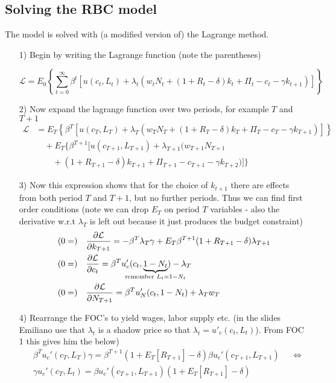 \documentclass[12pt, a4paper]{article}
\begin{document}
\begin{spacing}{1.213}
\subsection{Solving the RBC model}
The model is solved with (a modified version of) the Lagrange method. 
\begin{itemize}
\item[1)] Begin by writing the Lagrange function (note the parentheses)

\begin{equation*}
\mathcal{L} = E_0 \left\{ \sum_{t=0}^{\infty} \beta^t \left[ u(c_t, L_t) + \lambda_t (w_t N_t + (1+R_t - \delta)k_t + \Pi_t - c_t - \gamma k_{t+1}) \right] \right\}
\end{equation*}

\item[2)] Now expand the lagrange function over two periods, for example $T$ and $T+1$ 
\small
\begin{align*}
\mathcal{L} &= E_T \left\{  \beta^{T} \left[ u(c_{T}, L_{T}) + \lambda_{T} (w_{T} N_{T} + (1+R_{T} - \delta)k_{T} + \Pi_{T} - c_{T} - \gamma k_{T+1}) \right] \right\} \\
& \quad + E_T \big\{  \beta^{T+1} [ u(c_{T+1}, L_{T+1}) + \lambda_{T+1} (w_{T+1} N_{T+1}  \\
& \qquad + (1+R_{T+1} - \delta)k_{T+1} + \Pi_{T+1} - c_{T+1} - \gamma k_{T+2}) ] \big\} 
\end{align*}
\normalsize
\item[3)] Now this expression shows that for the choice of $k_{t+1}$ there are effects from both period $T$ and $T+1$, but no further periods. Thus we can find first order conditions (note we can drop $E_{T}$ on period $T$ variables - also the derivative w.r.t $\lambda_T$ is left out because it just produces the budget constraint)
\begin{align*}
& (0=) \quad \frac{\partial \mathcal{L}}{\partial k_{T+1}} = -\beta^T \lambda_T \gamma + E_T \beta^{T+1}(1+ R_{T+1} -\delta)\lambda_{T+1}
\\
& (0=) \quad \frac{\partial \mathcal{L}}{\partial c_t} = \beta^T u'_c(c_t,\underbrace{1-N_t}_{\mathclap{\textrm{remember } L_t = 1- N_t}}) - \lambda_T
\\
& (0=) \quad \frac{\partial \mathcal{L}}{\partial N_{T+1}} = \beta^T u'_{N}(c_t, 1-N_t) + \lambda_T w_T
\end{align*}

\item[4)] Rearrange the FOC's to yield wages, labor supply etc. (in the slides Emiliano use that $\lambda_t$ is a shadow price so that $\lambda_t = u'_c(c_t,L_t)$). From FOC 1 this gives him the below)
\begin{align*}
&\beta^T u_c'(c_T,L_T) \gamma = \beta^{T+1}(1+E_T[R_{T+1}] - \delta)\beta u_c'(c_{T+1},L_{T+1}) && \Leftrightarrow \\
& \gamma u_c'(c_T,L_t) = \beta u_c'(c_{T+1},L_{T+1}) (1 + E_T[R_{T+1}] - \delta)
\end{align*}


\end{itemize}
\end{spacing}
\end{document}

